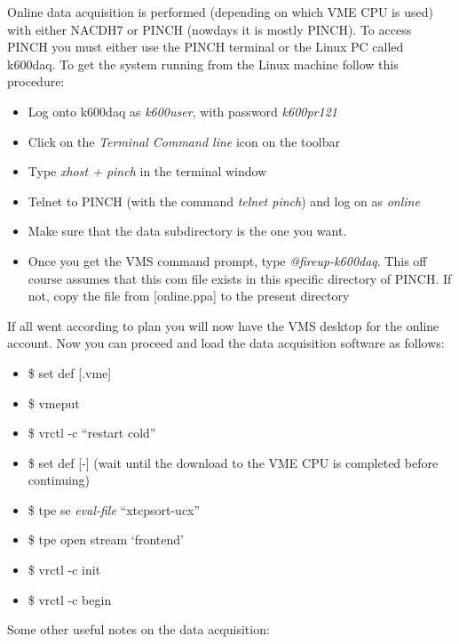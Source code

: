 \documentclass[11pt]{report}
\begin{document}
Online data acquisition is performed (depending on which VME CPU is used) with
either NACDH7 or PINCH (nowdays it is mostly PINCH). To access PINCH you must either
use the PINCH terminal or the  Linux PC called k600daq. 
To get the system running from the Linux machine follow this procedure:
\begin{itemize}
\item Log onto k600daq as {\it k600user}, with password {\it k600pr121}
\item Click on the {\it Terminal Command line} icon on the toolbar
\item Type {\it xhost + pinch} in the terminal window
\item Telnet to PINCH (with the command {\it telnet pinch}) and log on as {\it online}
\item Make sure that the data subdirectory is the one you want.
\item Once you get the VMS command prompt, type {\it @fireup-k600daq}. This off course assumes that this com file exists in this specific directory of PINCH. If not, copy the file from [online.ppa] to the present directory
\end{itemize}
If all went according to plan you will now have the VMS desktop for the online account. Now you can proceed and load the data acquisition software as follows:
\begin{itemize}
\item \$ set def [.vme]
\item \$ vmeput
\item \$ vrctl -c ``restart cold''
\item \$ set def [-]   \hspace{0.7cm} (wait until the download to the VME CPU is completed before continuing)
\item \$ tpe se {\it eval-file} ``xtcpsort-ucx''
\item \$ tpe open stream `frontend'
\item \$ vrctl -c init
\item \$ vrctl -c begin
\end{itemize}
Some other useful notes on the data acquisition:
\end{document}
